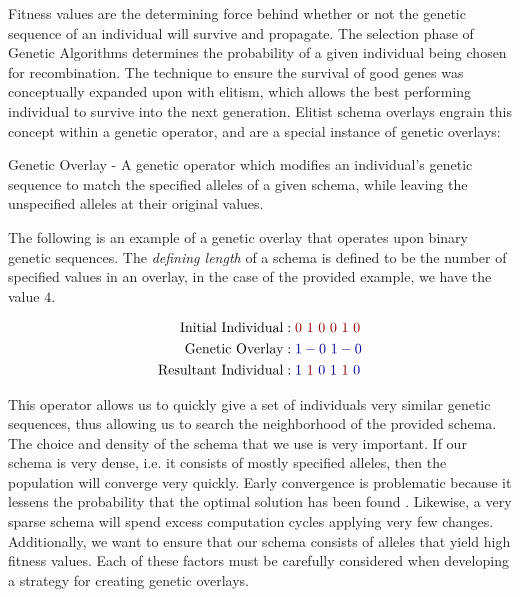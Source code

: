 Fitness values are the determining force behind whether or not the genetic sequence of an individual will survive and propagate. The selection phase of Genetic Algorithms determines the probability of a given individual being chosen for recombination. The technique to ensure the survival of good genes was conceptually expanded upon with elitism, which allows the best performing individual to survive into the next generation. Elitist schema overlays engrain this concept within a genetic operator, and are a special instance of genetic overlays:

\begin{overlay}
Genetic Overlay - A genetic operator which modifies an individual's genetic sequence to match the specified alleles of a given schema, while leaving the unspecified alleles at their original values. 
\end{overlay}

The following is an example of a genetic overlay that operates upon binary genetic sequences. The \emph{defining length} of a schema is defined to be the number of specified values in an overlay, in the case of the provided example, we have the value $4$.

\begin{displaymath}
\centering 
\begin{align*}
\text{Initial Individual} &: {\color{myred}0~1~0~0~1~0} 		\\
\text{Genetic Overlay} &: {\color{myblue}1-0~1-0}				\\
\text{Resultant Individual} &: {\color{myblue}1}~{\color{myred}1}~{\color{myblue}0~1}~{\color{myred}1}~{\color{myblue}0}	
\end{align*}
\end{displaymath}


This operator allows us to quickly give a set of individuals very similar genetic sequences, thus allowing us to search the neighborhood of the provided schema. The choice and density of the schema that we use is very important. If our schema is very dense, i.e. it consists of mostly specified alleles, then the population will converge very quickly. Early convergence is problematic because it lessens the probability that the optimal solution has been found \cite{Deb99}. Likewise, a very sparse schema will spend excess computation cycles applying very few changes. Additionally, we want to ensure that our schema consists of alleles that yield high fitness values. Each of these factors must be carefully considered when developing a strategy for creating genetic overlays. 

